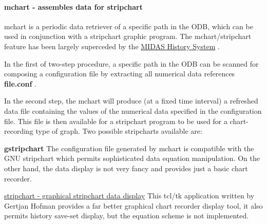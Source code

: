 \par


\par


\par


\label{F_LogUtil_idx_mchart-utility}
\hypertarget{F_LogUtil_idx_mchart-utility}{}
 \label{F_LogUtil_idx_stripchart}
\hypertarget{F_LogUtil_idx_stripchart}{}
 \hypertarget{F_LogUtil_F_mchart_utility}{}\paragraph{mchart       -\/ assembles data for stripchart}\label{F_LogUtil_F_mchart_utility}
mchart is a periodic data retriever of a specific path in the ODB, which can be used in conjunction with a stripchart graphic program. The mchart/stripchart feature has been largely superceded by the \hyperlink{F_History_logging_F_History_System}{MIDAS History System} .


\begin{DoxyItemize}
\item In the first of two-\/step procedure, a specific path in the ODB can be scanned for composing a configuration file by extracting all numerical data references {\bfseries file.conf} .
\item In the second step, the mchart will produce (at a fixed time interval) a refreshed data file containing the values of the numerical data specified in the configuration file. This file is then available for a stripchart program to be used for a chart-\/recording type of graph. Two possible stripcharts available are:
\end{DoxyItemize}

\label{F_LogUtil_F_gstripchart}
\hypertarget{F_LogUtil_F_gstripchart}{}



\begin{DoxyItemize}
\item {\bfseries gstripchart} The configuration file generated by mchart is compatible with the GNU stripchart which permits sophisticated data equation manipulation. On the other hand, the data display is not very fancy and provides just a basic chart recorder.
\item \hyperlink{F_LogUtil_F_stripchartfile}{stripchart -\/ graphical stripchart data display} This tcl/tk application written by Gertjan Hofman provides a far better graphical chart recorder display tool, it also permits history save-\/set display, but the equation scheme is not implemented.
\end{DoxyItemize}


